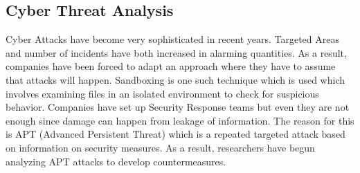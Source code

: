 \documentclass[11pt]{article}
\begin{document}
	\subsection{Cyber Threat Analysis}
	
	Cyber Attacks have become very sophisticated in recent years. Targeted Areas and number of incidents have both increased in alarming quantities. As a result, companies have been forced to adapt an approach where they have to assume that attacks will happen. Sandboxing is one such technique which is used which involves examining files in an isolated environment to check for suspicious behavior. Companies have set up Security Response teams but even they are not enough since damage can happen from leakage of information. The reason for this is APT (Advanced Persistent Threat) which is a repeated targeted attack based on information on security measures. As a result, researchers have begun analyzing APT attacks to develop countermeasures. 
	
\end{document}
